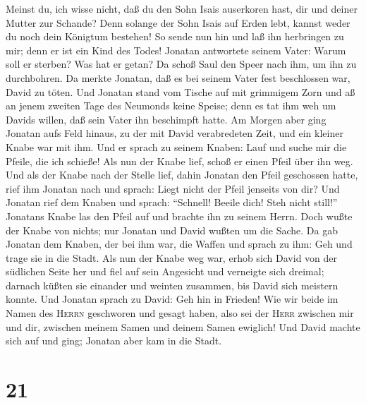 Meinst du, ich wisse nicht, daß du den Sohn Isais auserkoren hast, dir
und deiner Mutter zur Schande?  Denn solange der Sohn
Isais auf Erden lebt, kannst weder du noch dein Königtum bestehen! So
sende nun hin und laß ihn herbringen zu mir; denn er ist ein Kind des
Todes!  Jonatan antwortete seinem Vater: Warum soll er
sterben? Was hat er getan?  Da schoß Saul den Speer nach
ihm, um ihn zu durchbohren. Da merkte Jonatan, daß es bei seinem Vater
fest beschlossen war, David zu töten.  Und Jonatan stand
vom Tische auf mit grimmigem Zorn und aß an jenem zweiten Tage des
Neumonds keine Speise; denn es tat ihm weh um Davids willen, daß sein
Vater ihn beschimpft hatte.  Am Morgen aber ging Jonatan
aufs Feld hinaus, zu der mit David verabredeten Zeit, und ein kleiner
Knabe war mit ihm.  Und er sprach zu seinem Knaben: Lauf
und suche mir die Pfeile, die ich schieße! Als nun der Knabe lief, schoß
er einen Pfeil über ihn weg.  Und als der Knabe nach der
Stelle lief, dahin Jonatan den Pfeil geschossen hatte, rief ihm Jonatan
nach und sprach: Liegt nicht der Pfeil jenseits von dir? 
Und Jonatan rief dem Knaben und sprach: ``Schnell! Beeile dich! Steh
nicht still!'' Jonatans Knabe las den Pfeil auf und brachte ihn zu
seinem Herrn.  Doch wußte der Knabe von nichts; nur
Jonatan und David wußten um die Sache.  Da gab Jonatan
dem Knaben, der bei ihm war, die Waffen und sprach zu ihm: Geh und trage
sie in die Stadt.  Als nun der Knabe weg war, erhob sich
David von der südlichen Seite her und fiel auf sein Angesicht und
verneigte sich dreimal; darnach küßten sie einander und weinten
zusammen, bis David sich meistern konnte.  Und Jonatan
sprach zu David: Geh hin in Frieden! Wie wir beide im Namen des
\textsc{Herrn} geschworen und gesagt haben, also sei der \textsc{Herr}
zwischen mir und dir, zwischen meinem Samen und deinem Samen ewiglich!
Und David machte sich auf und ging; Jonatan aber kam in die Stadt.

\hypertarget{section-20}{%
\section{21}\label{section-20}}

